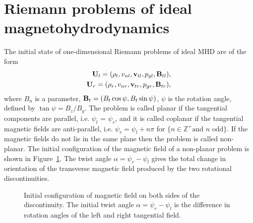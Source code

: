 \section[Riemann problems of ideal magnetohydrodynamics]{Riemann problems of ideal magnetohydrodynamics}
\label{sec:riemann_mhd}

The initial state of one-dimensional Riemann problems of ideal MHD are of the form
\begin{gather}
\begin{split}
\label{eqn:init_mhd}
\mathbf{U}_l = (\rho_l,v_{nl},\mathbf{v}_{tl},p_{gl},\mathbf{B}_{tl}), \\
\mathbf{U}_r = (\rho_r,v_{nr},\mathbf{v}_{tr},p_{gr},\mathbf{B}_{tr}),
\end{split}
\end{gather}
where $B_n$ is a parameter, $\mathbf{B}_{t} = (B_{t}\cos\psi,B_{t}\sin\psi)$, $\psi$ is the rotation angle, defined by $\tan\psi = B_z/B_y$.  The problem is called planar if the tangential components are parallel, i.e. $\psi_l$ = $\psi_r$, and it is called coplanar if the tangential magnetic fields are anti-parallel, i.e. $\psi_r = \psi_l + n\pi$ for $\{n\in \mathbb{Z}^+ \text{and } n \text { odd} \}$.  If the magnetic fields do not lie in the same plane then the problem is called non-planar.  The initial configuration of the magnetic field of a non-planar problem is shown in Figure~\ref{fig:bfield_init}.  The twist angle $\alpha = \psi_r - \psi_l$ gives the total change in orientation of the transverse magnetic field produced by the two rotational discontinuities.  

\begin{figure}[htbp]\figSpace 
\begin{center}

\end{center}
\caption{Initial configuration of magnetic field on both sides of the discontinuity.  The initial twist angle $\alpha = \psi_r - \psi_l$ is the difference in rotation angles of the left and right tangential field.}
\label{fig:bfield_init}
\figSpace
\end{figure}


